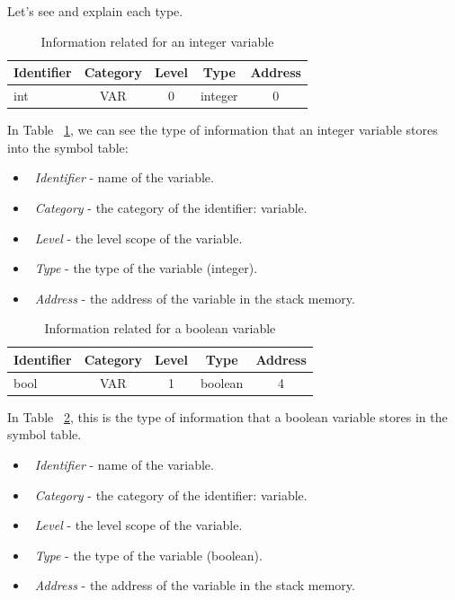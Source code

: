 \documentclass[
  oneside,
  11pt, a4paper,
  footinclude=true,
  headinclude=true,
  cleardoublepage=empty
]{scrbook}
\begin{document}
Let's see and explain each type.

\begin{table}[h!]
\centering
\caption{Information related for an integer variable}
\label{tbl:var_integer_information}
\begin{tabular}{l|c|c|c|c}
\multicolumn{1}{c|}{Identifier} & Category & Level & Type    & Address \\ \hline
int                             & VAR      & 0     & integer & 0      
\end{tabular}
\end{table}

In Table ~\ref{tbl:var_integer_information}, we can see the type of information that an integer variable stores into the symbol table:
\begin{itemize}
\item ~\textit{Identifier} - name of the variable.
\item ~\textit{Category} - the category of the identifier: variable.
\item ~\textit{Level} - the level scope of the variable.
\item ~\textit{Type} - the type of the variable (integer).
\item ~\textit{Address} - the address of the variable in the stack memory.
\end{itemize}

\newpage

\begin{table}[h!]
\centering
\caption{Information related for a boolean variable}
\label{tbl:var_boolean_information}
\begin{tabular}{l|c|c|c|c}
\multicolumn{1}{c|}{Identifier} & Category & Level & Type    & Address \\ \hline
bool                            & VAR      & 1     & boolean & 4      
\end{tabular}
\end{table}

In Table ~\ref{tbl:var_boolean_information}, this is the type of information that a boolean variable stores in the symbol table.

\begin{itemize}
\item ~\textit{Identifier} - name of the variable.
\item ~\textit{Category} - the category of the identifier: variable.
\item ~\textit{Level} - the level scope of the variable.
\item ~\textit{Type} - the type of the variable (boolean).
\item ~\textit{Address} - the address of the variable in the stack memory.
\end{itemize}
\end{document}
